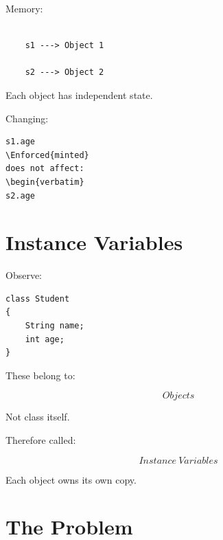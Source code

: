 \documentclass[11pt,a4paper]{book}
\begin{document}

Memory:

\begin{verbatim}

    s1 ---> Object 1

    s2 ---> Object 2

\end{verbatim}


Each object has independent state.


Changing:

\begin{verbatim}
s1.age
\Enforced{minted}
does not affect:
\begin{verbatim}
s2.age
\end{verbatim}


\section{Instance Variables}

Observe:

\begin{verbatim}
class Student
{
    String name;
    int age;
}
\end{verbatim}


These belong to:

\[
Objects
\]


Not class itself.


Therefore called:

\[
Instance\ Variables
\]


Each object owns its own copy.


\section{The Problem}
\end{document}
